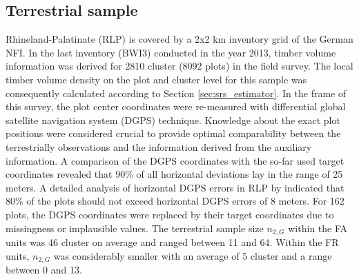 




\subsection{Terrestrial sample}

Rhineland-Palatinate (RLP) is covered by a 2x2 km inventory grid of the German NFI. In the last inventory (BWI3) conducted in the year 2013, timber volume information was derived for 2810 cluster (8092 plots) in the field survey. The local timber volume density on the plot and cluster level for this sample was consequently calculated according to Section \ref{sec:srs_estimator}. In the frame of this survey, the plot center coordinates were re-measured with differential global satellite navigation system (DGPS) technique. Knowledge about the exact plot positions were considered crucial to provide optimal comparability between the terrestrially observations and the information derived from the auxiliary information. A comparison of the DGPS coordinates with the so-far used target coordinates revealed that 90\% of all horizontal deviations lay in the range of 25 meters. A detailed analysis of horizontal DGPS errors in RLP by \citet{lambrecht2017} indicated that 80\% of the plots should not exceed horizontal DGPS errors of 8 meters. For 162 plots, the DGPS coordinates were replaced by their target coordinates due to missingness or implausible values. The terrestrial sample size $n_{2,G}$ within the FA units was 46 cluster on average and ranged between 11 and 64. Within the FR units, $n_{2,G}$ was considerably smaller with an average of 5 cluster and a range between 0 and 13.

